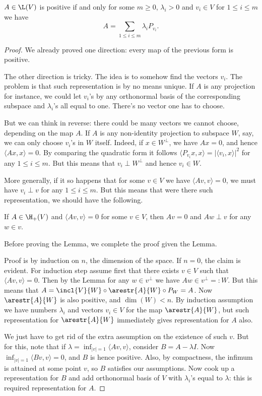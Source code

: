 \begin{lause}\label{cheapSpectral}
	$A \in \L(V)$ is positive if and only for some $m \geq 0$, $\lambda_{i} > 0$ and $v_{i} \in V$ for $1 \leq i \leq m$ we have
	\[
		A = \sum_{1 \leq i \leq m} \lambda_{i} P_{v_{i}}.
	\]
\end{lause}
\begin{proof}
	We already proved one direction: every map of the previous form is positive.

	The other direction is tricky. The idea is to somehow find the vectors $v_{i}$. The problem is that such representation is by no means unique. If $A$ is any projection for instance, we could let $v_{i}$'s by any orthonormal basis of the corresponding subspace and $\lambda_{i}$'s all equal to one. There's no vector one has to choose.

	But we can think in reverse: there could be many vectors we cannot choose, depending on the map $A$. If $A$ is any non-identity projection to subspace $W$, say, we can only choose $v_{i}$'s in $W$ itself. Indeed, if $x \in W^{\perp}$, we have $A x = 0$, and hence $\langle A x, x \rangle = 0$. By comparing the quadratic form it follows $\langle P_{v_{i}} x, x \rangle = |\langle v_{i}, x \rangle|^{2}$ for any $1 \leq i \leq m$. But this means that $v_{i} \perp W^{\perp}$ and hence $v_{i} \in W$.

	More generally, if it so happens that for some $v \in V$ we have $\langle A v, v \rangle = 0$, we must have $v_{i} \perp v$ for any $1 \leq i \leq m$. But this means that were there such representation, we should have the following.

	\begin{lem}\label{spectralZeroLemma}
		If $A \in \H_{+}(V)$ and $\langle A v, v \rangle = 0$ for some $v \in V$, then $A v = 0$ and $A w \perp v$ for any $w \in v$.
	\end{lem}

	Before proving the Lemma, we complete the proof given the Lemma.

	Proof is by induction on $n$, the dimension of the space. If $n = 0$, the claim is evident. For induction step assume first that there exists $v \in V$ such that $\langle A v, v \rangle = 0$. Then by the Lemma for any $w \in v^{\perp}$ we have $A w \in v^{\perp} =: W$. But this means that $A = \incl{V}{W} \circ \arestr{A}{W} \circ P_{W} = A$. Now $\arestr{A}{W}$ is also positive, and $\dim(W) < n$. By induction assumption we have numbers $\lambda_{i}$ and vectors $v_{i} \in V$ for the map $\arestr{A}{W}$, but such representation for $\arestr{A}{W}$ immediately gives representation for $A$ also.

	We just have to get rid of the extra assumption on the existence of such $v$. But for this, note that if $\lambda = \inf_{|v| = 1} \langle A v, v \rangle$, consider $B = A - \lambda I$. Now $\inf_{|v| = 1} \langle B v, v \rangle = 0$, and $B$ is hence positive. Also, by compactness, the infimum is attained at some point $v$, so $B$ satisfies our assumptions. Now cook up a representation for $B$ and add orthonormal basis of $V$ with $\lambda_{i}$'s equal to $\lambda$: this is required representation for $A$. 
\end{proof}

